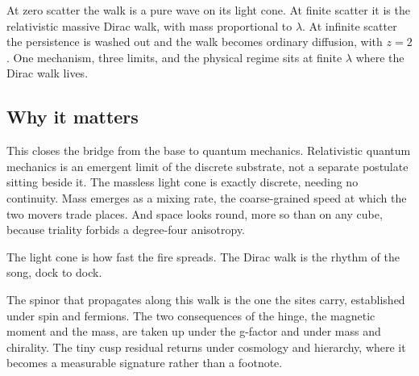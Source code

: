 At zero scatter the walk is a pure wave on its light cone. At finite scatter it is the relativistic massive Dirac
walk, with mass proportional to $\lambda$. At infinite scatter the persistence is washed out and the walk becomes
ordinary diffusion, with $z = 2$. One mechanism, three limits, and the physical regime sits at finite $\lambda$
where the Dirac walk lives.

\subsection{Why it matters}

This closes the bridge from the base to quantum mechanics. Relativistic quantum mechanics is an emergent limit of
the discrete substrate, not a separate postulate sitting beside it. The massless light cone is exactly discrete,
needing no continuity. Mass emerges as a mixing rate, the coarse-grained speed at which the two movers trade places.
And space looks round, more so than on any cube, because triality forbids a degree-four anisotropy.

\begin{principle}
The light cone is how fast the fire spreads. The Dirac walk is the rhythm of the song, dock to dock.
\end{principle}

The spinor that propagates along this walk is the one the sites carry, established under spin and fermions. The two
consequences of the hinge, the magnetic moment and the mass, are taken up under the g-factor and under mass and
chirality. The tiny cusp residual returns under cosmology and hierarchy, where it becomes a measurable signature
rather than a footnote.
